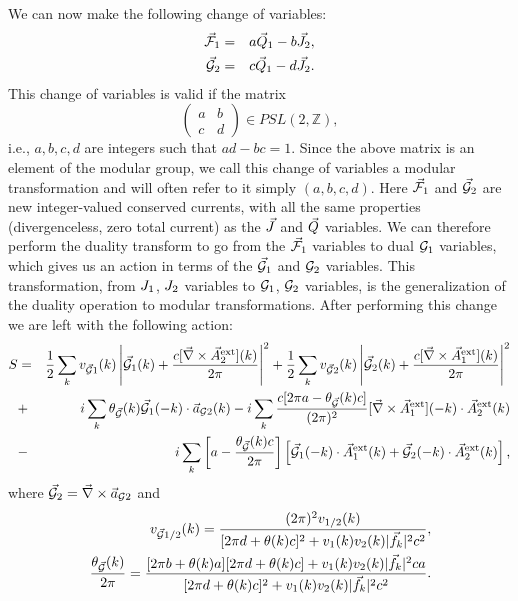 We can now make the following change of variables:\cite{Gen2Loops,FQHE}
\begin{eqnarray}
\vec{\mathcal{F}}_1 &=& a\vec{Q}_1 - b\vec{J}_2,\\
\vec{\mathcal{G}}_2 &=& c\vec{Q}_1 - d\vec{J}_2.
\label{modularshift}
\end{eqnarray}
This change of variables is valid if the matrix
\begin{equation}
\begin{pmatrix}
a & b \\
c & d 
\end{pmatrix}
\in PSL(2,\mathbb{Z}),
\end{equation}
i.e.,  $a,b,c,d$ are integers such that $ad-bc=1$. Since the above matrix is an element of the modular group, we call this change of variables a modular transformation and will often refer to it simply $(a,b,c,d)$. Here $\vec{\mathcal{F}}_1$ and $\vec{\mathcal{G}}_2$ are new integer-valued conserved currents, with all the same properties (divergenceless, zero total current) as the $\vec{J}$ and $\vec{Q}$ variables. We can therefore perform the duality transform to go from the $\vec{\mathcal{F}}_1$ variables to dual ${\cal G}_1$ variables, which gives us an action in terms of the $\vec{\mathcal{G}}_1$ and ${\cal G}_2$ variables. This transformation, from $J_1$, $J_2$ variables to ${\cal G}_1$, ${\cal G}_2$ variables, is the generalization of the duality operation to modular transformations. After performing this change we are left with the following action:
\begin{eqnarray}
S&=&\frac{1}{2}\sum_k v_{\vec{\mathcal{G}}1}(k) \left|\vec{\mathcal{G}}_1(k)+\frac{c[\vec{\nabla}\times\vec{A}_{2}^{\rm ext}](k)}{2\pi}\right|^2
+\frac{1}{2}\sum_k v_{\vec{\mathcal{G}}2}(k)\left|\vec{\mathcal{G}}_2(k)+\frac{c[\vec{\nabla}\times\vec{A}_{1}^{\rm ext}](k)}{2\pi}\right|^2\nonumber\\
&+&i\sum_k \theta_{\vec{\mathcal{G}}}(k) \vec{\mathcal{G}}_1(-k)\cdot \vec{a}_{{\cal G}2}(k)
-i\sum_k \frac{c[2\pi a-\theta_{\vec{\mathcal{G}}}(k)c]}{(2\pi)^2} [\vec{\nabla}\times\vec{A}_{1}^{\rm ext}](-k)\cdot \vec{A}_{2}^{\rm ext}(k)\nonumber\\
&-& i\sum_k \left[a - \frac{\theta_{\vec{\mathcal{G}}}(k) c}{2\pi}\right]\left[\vec{\mathcal{G}}_1(-k) \cdot \vec{A}_{1}^{\rm ext}(k) + \vec{\mathcal{G}}_2(-k) \cdot \vec{A}_{2}^{\rm ext}(k) \right],
\label{gaction}
\end{eqnarray}
where $\vec{\mathcal{G}}_2=\vec{\nabla}\times \vec{a}_{{\cal G}2}$ and
\begin{eqnarray}
&&\!\!\!\!\! v_{\GG1/2}(k)=\frac{(2\pi)^2v_{1/2}(k)}{[2\pi d+\theta(k) c]^2+ v_{1}(k)v_{2}(k)|\vec{f}_k|^2c^2},\label{VJ}\\
&&\!\!\!\!\! \frac{\theta_{\GG}(k)}{2\pi}=\frac{[2\pi b+\theta(k) a][2\pi d + \theta(k) c]+v_{1}(k)v_{2}(k)|\vec{f}_k|^2ca}{[2\pi d+\theta(k) c]^2+ v_{1}(k)v_{2}(k)|\vec{f}_k|^2c^2}.\label{TJ}
\end{eqnarray}

